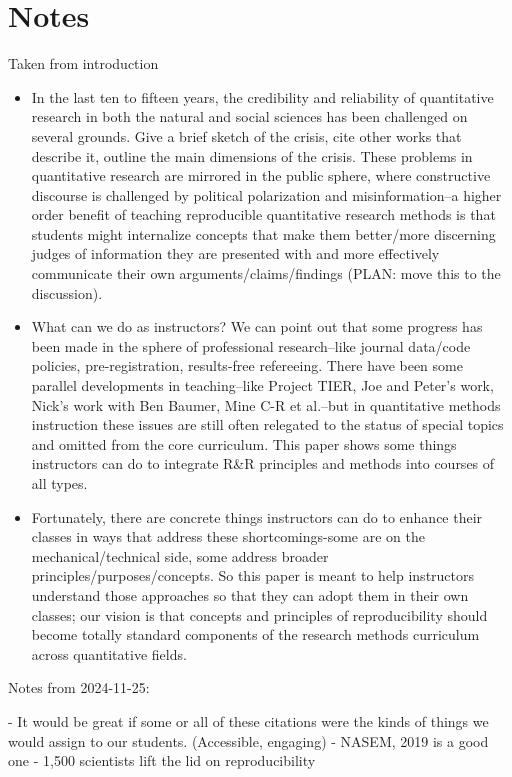 \documentclass{article}
\begin{document}
\section*{Notes}

Taken from introduction

\begin{itemize}
\item In the last ten to fifteen years, the credibility and reliability of quantitative research in both the natural and social sciences has been challenged on several grounds.  Give a brief sketch of the crisis, cite other works that describe it, outline the main dimensions of the crisis.
These problems in quantitative research are mirrored in the public sphere, where constructive discourse is challenged by political polarization and misinformation–a higher order benefit of teaching reproducible quantitative research methods is that students might internalize concepts that make them better/more discerning judges of information they are presented with and more effectively communicate their own arguments/claims/findings (PLAN: move this to the discussion).

\item What can we do as instructors?  We can point out that some progress has been made in the sphere of professional research–like journal data/code policies, pre-registration, results-free refereeing.  There have been some parallel developments in teaching–like Project TIER, Joe and Peter’s work, Nick’s work with Ben Baumer, Mine C-R et al.--but in quantitative methods instruction these issues are still often relegated to the status of special topics and omitted from the core curriculum.  This paper shows some things instructors can do to integrate R&R principles and methods into courses of all types.

\item Fortunately, there are concrete things instructors can do to enhance their classes in ways that address these shortcomings-some are on the mechanical/technical side, some address broader principles/purposes/concepts.  So this paper is meant to help instructors understand those approaches so that they can adopt them in their own classes; our vision is that concepts and principles of reproducibility should become totally standard components of the research methods curriculum across quantitative fields.
\end{itemize}

Notes from 2024-11-25:

- It would be great if some or all of these citations were the kinds of things we would assign to our students. (Accessible, engaging) 
- NASEM, 2019 is a good one
- 1,500 scientists lift the lid on reproducibility
\end{document}
